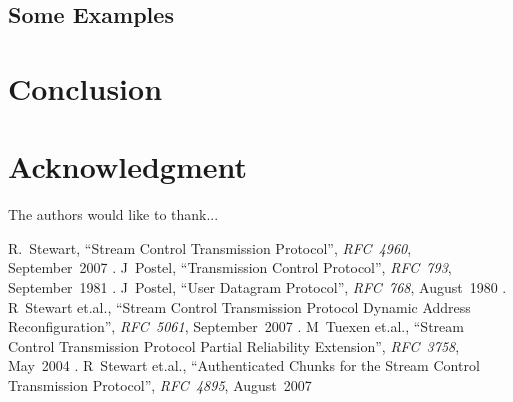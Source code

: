 \documentclass[conference]{IEEEtran}
\begin{document}
\subsection{Some Examples}


\section{Conclusion}

\section*{Acknowledgment}


The authors would like to thank...


\begin{thebibliography}{11}
 R.~Stewart,
  ``Stream Control Transmission Protocol'',
  \textit{RFC~4960},
  September~2007
.  J~Postel,
  ``Transmission Control Protocol'',
  \textit{RFC~793},
  September~1981
.  J~Postel,
  ``User Datagram Protocol'',
  \textit{RFC~768},
  August~1980
.  R~Stewart et.al.,
  ``Stream Control Transmission Protocol Dynamic Address Reconfiguration'',
  \textit{RFC~5061},
  September~2007
.  M~Tuexen et.al.,
 ``Stream Control Transmission Protocol Partial Reliability Extension'',
  \textit{RFC~3758},
  May~2004
.  R~Stewart et.al.,
  ``Authenticated Chunks for the Stream Control Transmission Protocol'',
  \textit{RFC~4895},
  August~2007


\end{thebibliography}




\end{document}
